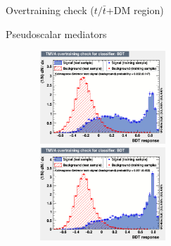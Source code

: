 \documentclass[8pt]{beamer}
\begin{document}
\begin{frame}{Overtraining check ($t/\bar t$+DM region)}
\vspace{-5pt}
\begin{block}{\centering Pseudoscalar mediators}\end{block} \vspace{-10pt}
\begin{figure}[htbp]
\centering
\begin{minipage}[b]{.49\textwidth}
\begin{center}
\includegraphics[width=5.2cm, height=3.5cm]{figs/overtraining_pseudo100_ST.png}
\end{center}
\end{minipage}\hfill
\begin{minipage}[b]{.49\textwidth}
\begin{center}
\includegraphics[width=5.2cm, height=3.5cm]{figs/overtraining_pseudo500_ST.png}
\end{center}
\end{minipage} \hfill
\end{figure} \vfill
\end{frame}
\end{document}
